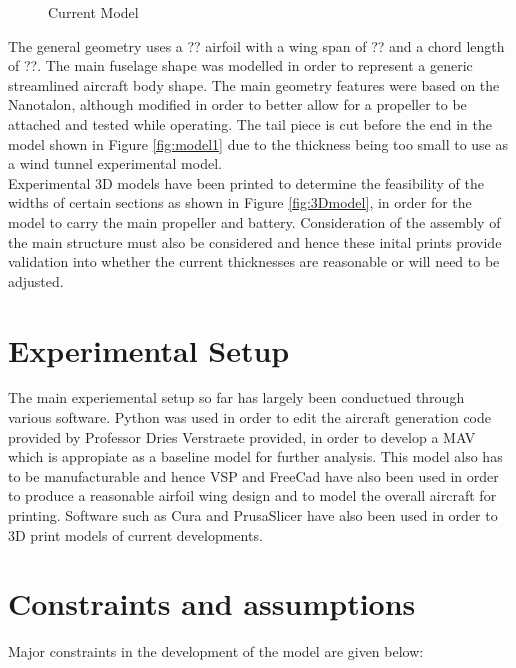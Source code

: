 \begin{figure}[h!]
    \centering
    \caption{Current Model}
    \label{fig:FineMesh}
\end{figure}
The general geometry uses a ?? airfoil with a wing span of ?? and a chord length of ??. The main fuselage shape was modelled in order to represent a generic streamlined aircraft body shape. The main geometry features were based on the Nanotalon, although modified in order to better allow for a propeller to be attached and tested while operating. The tail piece is cut before the end in the model shown in Figure \ref{fig:model1} due to the thickness being too small to use as a wind tunnel experimental model.\\ 
Experimental 3D models have been printed to determine the feasibility of the widths of certain sections as shown in Figure \ref{fig:3Dmodel}, in order for the model to carry the main propeller and battery. Consideration of the assembly of the main structure must also be considered and hence these inital prints provide validation into whether the current thicknesses are reasonable or will need to be adjusted. 

\section{Experimental Setup}
\label{sec:Experimental Setup}
The main experiemental setup so far has largely been conductued through various software. Python was used in order to edit the aircraft generation code provided by Professor Dries Verstraete provided, in order to develop a MAV which is appropiate as a baseline model for further analysis. This model also has to be manufacturable and hence VSP and FreeCad have also been used in order to produce a reasonable airfoil wing design and to model the overall aircraft for printing. Software such as Cura and PrusaSlicer have also been used in order to 3D print models of current developments. 


\section{Constraints and assumptions}
\label{sec: Constraints and assumptions}
Major constraints in the development of the model are given below: 

